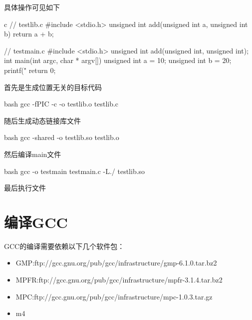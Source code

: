 具体操作可见如下

\begin{code-block}{c}
// testlib.c
#include <stdio.h>
unsigned int add(unsigned int a, unsigned int b)
{
        return a + b;
}

// testmain.c
#include <stdio.h>
unsigned int add(unsigned int, unsigned int);
int main(int argc, char * argv[])
{
        unsigned int a = 10;
        unsigned int b = 20;
        printf("%
        return 0;
}
\end{code-block}

首先是生成位置无关的目标代码
\begin{code-block}{bash}
gcc -fPIC -c -o testlib.o testlib.c
\end{code-block}

随后生成动态链接库文件
\begin{code-block}{bash}
gcc -shared -o testlib.so testlib.o
\end{code-block}

然后编译main文件
\begin{code-block}{bash}
gcc -o testmain testmain.c -L./ testlib.so
\end{code-block}

最后执行文件

\section{编译GCC}
GCC的编译需要依赖以下几个软件包：
\begin{itemize}
  \item GMP:ftp://gcc.gnu.org/pub/gcc/infrastructure/gmp-6.1.0.tar.bz2
  \item MPFR:ftp://gcc.gnu.org/pub/gcc/infrastructure/mpfr-3.1.4.tar.bz2
  \item MPC:ftp://gcc.gnu.org/pub/gcc/infrastructure/mpc-1.0.3.tar.gz
  \item m4
\end{itemize}

